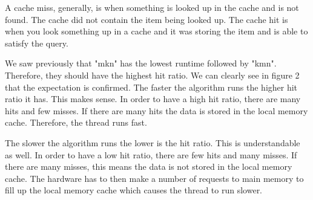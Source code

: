 \documentclass{article}
\begin{document}
A cache miss, generally, is when something is looked up in the cache and is not found. The cache did not contain the item being looked up. The cache hit is when you look something up in a cache and it was storing the item and is able to satisfy the query.

We saw previously that "mkn" has the lowest runtime followed by "kmn". Therefore, they should have the highest hit ratio. We can clearly see in figure 2 that the expectation is confirmed. The faster the algorithm runs the higher hit ratio it has. This makes sense. In order to have a high hit ratio, there are many hits and few misses. If there are many hits the data is stored in the local memory cache. Therefore, the thread runs fast.

The slower the algorithm runs the lower is the hit ratio. This is understandable as well. In order to have a low hit ratio, there are few hits and many misses. If there are many misses, this means the data is not stored in the local memory cache. The hardware has to then make a number of requests to main memory to fill up the local memory cache which causes the thread to run slower.
\end{document}
